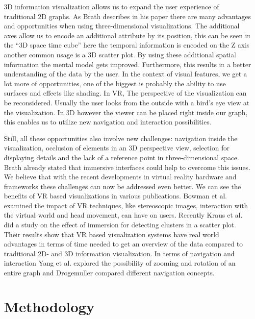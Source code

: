 3D information visualization allows us to expand the user experience of traditional 2D graphs. As Brath describes in his paper \cite{brath_3d_2014} there are many advantages and opportunities when using three-dimensional visualizations.
The additional axes allow us to encode an additional attribute by its position, this can be seen in the “3D space time cube” \cite{brath_3d_2014} here the temporal information is encoded on the Z axis another common usage is a 3D scatter plot. By using these additional spatial information the mental model gets improved. Furthermore, this results in a better understanding of the data by the user.
In the context of visual features, we get a lot more of opportunities, one of the biggest is probably the ability to use surfaces and effects like shading. 
In VR, The perspective of the visualization can be reconsidered. Usually the user looks from the outside with a bird's eye view at the visualization. In 3D however the viewer can be placed right inside our graph, this enables us to utilize new navigation and interaction possibilities. 

Still, all these opportunities also involve new challenges: navigation inside the visualization, occlusion of elements in an 3D perspective view, selection for displaying details and the lack of a reference point in three-dimensional space. Brath \cite{brath_3d_2014} already stated that immersive interfaces could help to overcome this issues.
 We believe that with the recent developments in virtual reality hardware and frameworks these challenges can now be addressed even better. 
 We can see the benefits of VR based visualizations in various publications. Bowman et al. \cite{bowman_virtual_2007} examined the impact of VR techniques, like stereoscopic images, interaction with the virtual world and head movement, can have on users. 
 Recently Kraus et al. \cite{kraus_impact_2020} did a study on the effect of immersion for detecting clusters in a scatter plot. Their results show that VR based visualization systems have real world advantages in terms of time needed to get an overview of the data compared to traditional 2D- and 3D information visualization. In terms of navigation and interaction Yang et al. \cite{yang_embodied_2020} explored the possibility of zooming and rotation of an entire graph and Drogemuller \cite{drogemuller_examining_2020} compared different navigation concepts.
 
 \section{Methodology}

